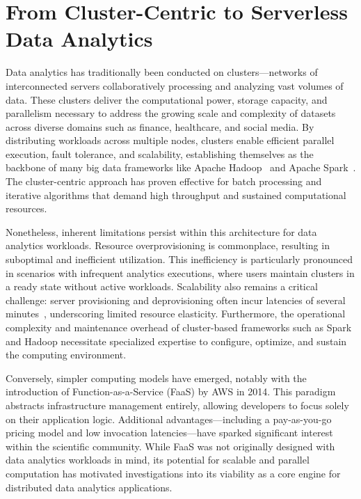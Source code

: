 \section{From Cluster-Centric to Serverless Data Analytics}
Data analytics has traditionally been conducted on clusters—networks of interconnected servers collaboratively processing and analyzing vast volumes of data. These clusters deliver the computational power, storage capacity, and parallelism necessary to address the growing scale and complexity of datasets across diverse domains such as finance, healthcare, and social media. By distributing workloads across multiple nodes, clusters enable efficient parallel execution, fault tolerance, and scalability, establishing themselves as the backbone of many big data frameworks like Apache Hadoop~\citep{hadoop} and Apache Spark~\citep{spark}. The cluster-centric approach has proven effective for batch processing and iterative algorithms that demand high throughput and sustained computational resources.

Nonetheless, inherent limitations persist within this architecture for data analytics workloads. Resource overprovisioning is commonplace, resulting in suboptimal and inefficient utilization. This inefficiency is particularly pronounced in scenarios with infrequent analytics executions, where users maintain clusters in a ready state without active workloads. Scalability also remains a critical challenge: server provisioning and deprovisioning often incur latencies of several minutes~\citep{burst}, underscoring limited resource elasticity. Furthermore, the operational complexity and maintenance overhead of cluster-based frameworks such as Spark and Hadoop necessitate specialized expertise to configure, optimize, and sustain the computing environment.

Conversely, simpler computing models have emerged, notably with the introduction of Function-as-a-Service (FaaS) by AWS in 2014. This paradigm abstracts infrastructure management entirely, allowing developers to focus solely on their application logic. Additional advantages—including a pay-as-you-go pricing model and low invocation latencies—have sparked significant interest within the scientific community. While FaaS was not originally designed with data analytics workloads in mind, its potential for scalable and parallel computation has motivated investigations into its viability as a core engine for distributed data analytics applications.

